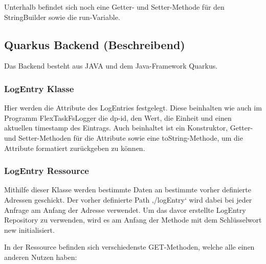 Unterhalb befindet sich noch eine Getter- und Setter-Methode für den StringBuilder sowie die run-Variable.

\subsection{Quarkus Backend (Beschreibend)}
Das Backend besteht aus JAVA und dem Java-Framework Quarkus. 

\subsubsection{LogEntry Klasse}
Hier werden die Attribute des LogEntries festgelegt. Diese beinhalten wie auch im Programm FlexTaskFsLogger die dp-id, den Wert, die Einheit und einen aktuellen timestamp des Eintrags. 
Auch beinhaltet ist ein Konstruktor, Getter- und Setter-Methoden für die Attribute sowie eine toString-Methode, um die Attribute formatiert zurückgeben zu können. 

\subsubsection{LogEntry Ressource}
Mithilfe dieser Klasse werden bestimmte Daten an bestimmte vorher definierte Adressen geschickt. 
Der vorher definierte Path ‚/logEntry‘ wird dabei bei jeder Anfrage am Anfang der Adresse verwendet. 
Um das davor erstellte LogEntry Repository zu verwenden, wird es am Anfang der Methode mit dem Schlüsselwort new initialisiert.

In der Ressource befinden sich verschiedenste GET-Methoden, welche alle einen anderen Nutzen haben: 

